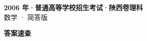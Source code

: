 \documentclass[zihao=-4, a4paper]{ctexart}
\begin{document}
\begin{center}
  {\Large\bfseries 2006 年·普通高等学校招生考试·陕西卷理科}\\[4pt]
  {\large 数学 · 简答版}
\end{center}
\medskip
{}

\clearpage
{}
\begin{center}{\Large\bfseries 答案速查}\end{center}
\medskip

\end{document}
